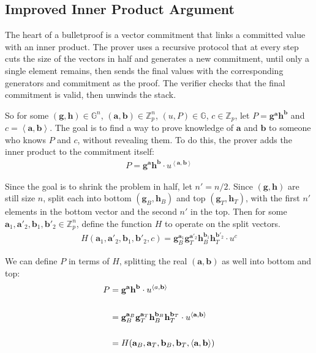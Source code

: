 \documentclass{article}
\begin{document}
\subsection{Improved Inner Product Argument}

The heart of a bulletproof is a vector commitment that links a committed value with an inner product.  The prover uses a recursive protocol that at every step cuts the size of the vectors in half and generates a new commitment, until only a single element remains, then sends the final values with the corresponding generators and commitment as the proof.  The verifier checks that the final commitment is valid, then unwinds the stack.

So for some $(\textbf{g}, \textbf{h}) \in \mathbb{G}^n$, $(\textbf{a}, \textbf{b}) \in \mathbb{Z}_p^n$, $(u, P) \in \mathbb{G}$, $c \in \mathbb{Z}_p$, let $P = \textbf{g}^\textbf{a} \textbf{h}^\textbf{b}$ and $c = \left<\textbf{a}, \textbf{b}\right>$.  The goal is to find a way to prove knowledge of $\textbf{a}$ and $\textbf{b}$ to someone who knows $P$ and $c$, without revealing them.  To do this, the prover adds the inner product to the commitment itself:
\begin{align}
  P = \textbf{g}^\textbf{a} \textbf{h}^\textbf{b} \cdot u^{\left<\textbf{a}, \textbf{b}\right>}
\end{align}

Since the goal is to shrink the problem in half, let $n' = n/2$.  Since $(\textbf{g}, \textbf{h})$ are still size $n$, split each into bottom $(\textbf{g}_{B}, \textbf{h}_{B})$ and top $(\textbf{g}_{T}, \textbf{h}_{T})$, with the first $n'$ elements in the bottom vector and the second $n'$ in the top.  Then for some $\textbf{a}_1, \textbf{a}'_2, \textbf{b}_1, \textbf{b}'_2 \in \mathbb{Z}_p^n$, define the function $H$ to operate on the split vectors. 
\begin{align}
  H(\textbf{a}_1, \textbf{a}'_2, \textbf{b}_1, \textbf{b}'_2, c) = \textbf{g}_{B}^{\textbf{a}_1} \textbf{g}_{T}^{\textbf{a}'_2} \textbf{h}_{B}^{\textbf{b}_1} \textbf{h}_{T}^{\textbf{b}'_2} \cdot u^c
\end{align}

We can define $P$ in terms of $H$, splitting the real $(\textbf{a}, \textbf{b})$ as well into bottom and top:
\begin{align}
  P &= \textbf{g}^{\textbf{a}} \textbf{h}^{\textbf{b}} \cdot u^{\left<a, \textbf{b}\right>}\\
  \cr &= \textbf{g}_{B}^{\textbf{a}_{B}} \textbf{g}_{T}^{\textbf{a}_{T}} \textbf{h}_{B}^{\textbf{b}_{B}} \textbf{h}_{T}^{\textbf{b}_{T}} \cdot u^{\left<\textbf{a}, \textbf{b}\right>}\\
  \cr &= H(\textbf{a}_{B}, \textbf{a}_{T}, \textbf{b}_{B}, \textbf{b}_{T}, \left<\textbf{a}, \textbf{b}\right>)
\end{align}
\end{document}
